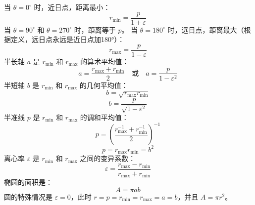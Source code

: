 当 \( \theta = 0^\circ \) 时，近日点，距离最小：
\[
r_{\min} = \frac{p}{1 + \varepsilon}~
\]
当 \( \theta = 90^\circ \) 和 \( \theta = 270^\circ \) 时，距离等于 \( p \)。
当 \( \theta = 180^\circ \) 时，远日点，距离最大（根据定义，远日点永远是近日点加180°）：
\[
r_{\max} = \frac{p}{1 - \varepsilon}~
\]
半长轴 \( a \) 是 \( r_{\min} \) 和 \( r_{\max} \) 的算术平均值：
\[
a = \frac{r_{\max} + r_{\min}}{2}
\quad \text{或} \quad a = \frac{p}{1 - \varepsilon^2}~
\]
半短轴 \( b \) 是 \( r_{\min} \) 和 \( r_{\max} \) 的几何平均值：
\[
b = \sqrt{r_{\max} r_{\min}}~
\]
\[
b = \frac{p}{\sqrt{1 - \varepsilon^2}}~
\]
半准线 \( p \) 是 \( r_{\min} \) 和 \( r_{\max} \) 的调和平均值：
\[
p = \left( \frac{r_{\max}^{-1} + r_{\min}^{-1}}{2} \right)^{-1}~
\]
\[p = r_{\max} r_{\min} = b^2~\]
离心率 \( \varepsilon \) 是 \( r_{\min} \) 和 \( r_{\max} \) 之间的变异系数：
\[
\varepsilon = \frac{r_{\max} - r_{\min}}{r_{\max} + r_{\min}}~
\]
椭圆的面积是：
\[
A = \pi ab~
\]
圆的特殊情况是 \( \varepsilon = 0 \)，此时 \( r = p = r_{\min} = r_{\max} = a = b \)，并且 \( A = \pi r^2 \)。


